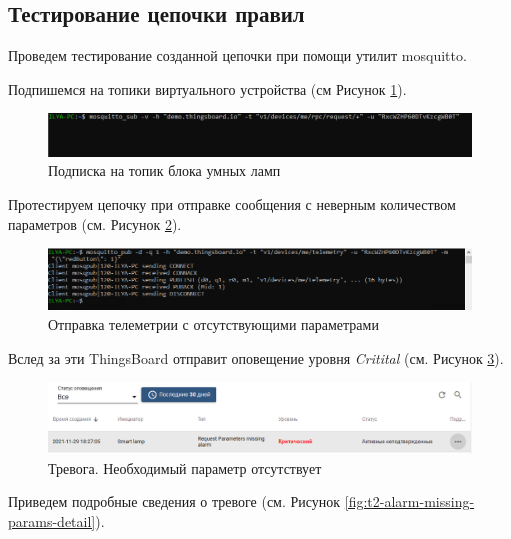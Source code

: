 \documentclass[a4paper,14pt]{extarticle}
\begin{document}
\subsection*{Тестирование цепочки правил}
\label{sec:lamp-test}

Проведем тестирование созданной цепочки при помощи утилит mosquitto.

Подпишемся на топики виртуального устройства (см Рисунок \ref{fig:t2-listen-p2}).
\begin{figure}[h!]
	\centering
	\includegraphics[width=1\linewidth]{images/t2-listen-p2}
	\caption{Подписка на топик блока умных ламп}
	\label{fig:t2-listen-p2}
\end{figure}

Протестируем цепочку при отправке сообщения с неверным количеством параметров (см. Рисунок \ref{fig:t2-send}).

\begin{figure}[h!]
	\centering
	\includegraphics[width=1\linewidth]{images/t2-send}
	\caption{Отправка телеметрии с отсутствующими параметрами}
	\label{fig:t2-send}
\end{figure}

Вслед за эти ThingsBoard отправит оповещение уровня \textit{Critital} (см. Рисунок \ref{fig:t2-alarm-missing-params}).

\begin{figure}[h!]
	\centering
	\includegraphics[width=1\linewidth]{images/t2-alarm-missing-params}
	\caption{Тревога. Необходимый параметр отсутствует}
	\label{fig:t2-alarm-missing-params}
\end{figure}

Приведем подробные сведения о тревоге (см. Рисунок \ref{fig:t2-alarm-missing-params-detail}).
\end{document}
